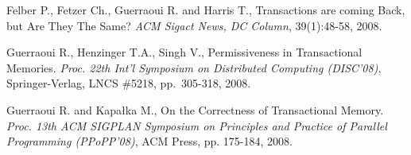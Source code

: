 \begin{thebibliography}{99}
{
Felber P., Fetzer Ch., Guerraoui R. and Harris T., 
Transactions are coming Back, but Are They The Same?
{\it ACM Sigact News, DC Column}, 39(1):48-58, 2008.







Guerraoui R., Henzinger T.A., Singh V.,
Permissiveness  in Transactional Memories. 
{\em Proc. 22th Int'l Symposium on Distributed Computing (DISC'08)},
Springer-Verlag, LNCS \#5218, pp.~305-318, 2008.


% 
% 




Guerraoui R. and Kapa\l{}ka M., 
On the Correctness of Transactional Memory. 
{\it Proc. 13th ACM SIGPLAN Symposium on Principles and Practice of 
Parallel Programming (PPoPP'08)}, ACM Press, pp. 175-184, 2008. 




}
\end{thebibliography}

